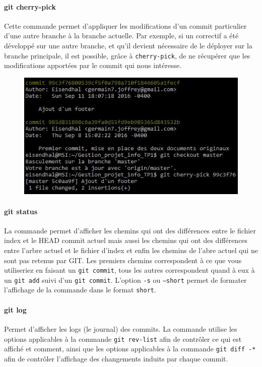 \documentclass[11pt,canadien]{article}
\begin{document}
\paragraph{git cherry-pick}Cette commande permet d'appliquer les modifications d'un commit particulier d'une autre branche à la branche actuelle. Par exemple, si un correctif a été développé sur une autre branche, et qu'il devient nécessaire de le déployer sur la branche principale, il est possible, grâce à \texttt{cherry-pick}, de ne récupérer que les modifications apportées par le commit qui nous intéresse.
\begin{figure}[H]
	\centering
	\includegraphics[width=\textwidth]{images/git_cherry-pick.jpg}
\end{figure}

\paragraph{git status}La commande permet d'afficher les chemins qui ont des différences entre le fichier index et le HEAD commit actuel mais aussi les chemins qui ont des différences entre l'arbre actuel et le fichier d'index et enfin les chemins de l'abre actuel qui ne sont pas retenus par GIT. Les premiers chemins correspondent à ce que vous utiliseriez en faisant un \texttt{git commit}, tous les autres correspondent quand à eux à un \texttt{git add} suivi d'un \texttt{git commit}. L'option \texttt{-s} ou \texttt{--short} permet de formater l'affichage de la commande dans le format \texttt{short}.

\paragraph{git log}Permet d'afficher les logs (le journal) des commits. La commande utilise les options applicables à la commande \texttt{git rev-list} afin de contrôler ce qui est affiché et comment, ainsi que les options applicables à la commande \texttt{git diff -*} afin de contrôler l'affichage des changements induits par chaque commit.
\end{document}
